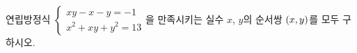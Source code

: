 연립방정식 $\begin{cases} xy-x-y=-1 \\ x^2+xy+y^2=13 \end{cases}$을 만족시키는 실수 $x$, $y$의 순서쌍 $(x{,}\mkern3mu\mathopen{}y)$를 모두 구하시오.
